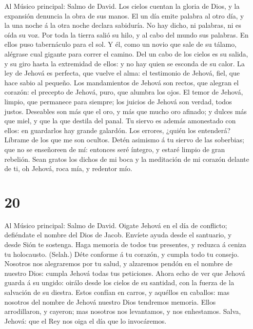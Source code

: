  Al Músico principal: Salmo de David. Los cielos cuentan
la gloria de Dios, y la expansión denuncia la obra de sus manos.
 El un día emite palabra al otro día, y la una noche á la
otra noche declara sabiduría.  No hay dicho, ni palabras,
ni es oída su voz.  Por toda la tierra salió su hilo, y al
cabo del mundo sus palabras. En ellos puso tabernáculo para el sol.
 Y él, como un novio que sale de su tálamo, alégrase cual
gigante para correr el camino.  Del un cabo de los cielos
es su salida, y su giro hasta la extremidad de ellos: y no hay quien se
esconda de su calor.  La ley de Jehová es perfecta, que
vuelve el alma: el testimonio de Jehová, fiel, que hace sabio al
pequeño.  Los mandamientos de Jehová son rectos, que
alegran el corazón: el precepto de Jehová, puro, que alumbra los ojos.
 El temor de Jehová, limpio, que permanece para siempre;
los juicios de Jehová son verdad, todos justos. 
Deseables son más que el oro, y más que mucho oro afinado; y dulces más
que miel, y que la que destila del panal.  Tu siervo es
además amonestado con ellos: en guardarlos hay grande galardón.
 Los errores, ¿quién los entenderá? Líbrame de los que me
son ocultos.  Detén asimismo á tu siervo de las
soberbias; que no se enseñoreen de mí: entonces seré íntegro, y estaré
limpio de gran rebelión.  Sean gratos los dichos de mi
boca y la meditación de mi corazón delante de ti, oh Jehová, roca mía, y
redentor mío.

\hypertarget{section-19}{%
\section{20}\label{section-19}}

 Al Músico principal: Salmo de David. Oigate Jehová en el
día de conflicto; defiéndate el nombre del Dios de Jacob. 
Envíete ayuda desde el santuario, y desde Sión te sostenga.
 Haga memoria de todos tus presentes, y reduzca á ceniza
tu holocausto. (Selah.)  Déte conforme á tu corazón, y
cumpla todo tu consejo.  Nosotros nos alegraremos por tu
salud, y alzaremos pendón en el nombre de nuestro Dios: cumpla Jehová
todas tus peticiones.  Ahora echo de ver que Jehová guarda
á su ungido: oirálo desde los cielos de su santidad, con la fuerza de la
salvación de su diestra.  Estos confían en carros, y
aquéllos en caballos: mas nosotros del nombre de Jehová nuestro Dios
tendremos memoria.  Ellos arrodillaron, y cayeron; mas
nosotros nos levantamos, y nos enhestamos.  Salva, Jehová:
que el Rey nos oiga el día que lo invocáremos.

